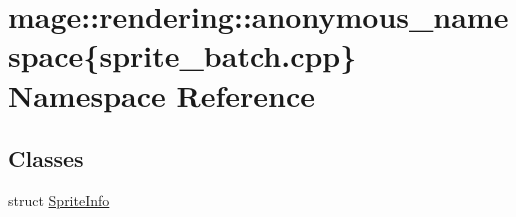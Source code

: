 \hypertarget{namespacemage_1_1rendering_1_1anonymous__namespace_02sprite__batch_8cpp_03}{}\section{mage\+:\+:rendering\+:\+:anonymous\+\_\+namespace\{sprite\+\_\+batch.\+cpp\} Namespace Reference}
\label{namespacemage_1_1rendering_1_1anonymous__namespace_02sprite__batch_8cpp_03}
\subsection*{Classes}
\begin{DoxyCompactItemize}
\item 
struct \mbox{\hyperlink{structmage_1_1rendering_1_1anonymous__namespace_02sprite__batch_8cpp_03_1_1_sprite_info}{Sprite\+Info}}
\end{DoxyCompactItemize}
